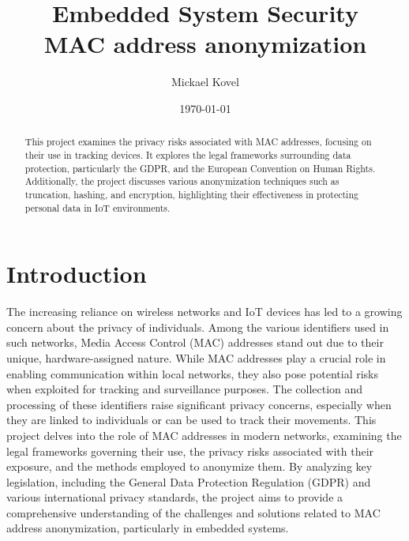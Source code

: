 \documentclass[aps,prb,twocolumn,superscriptaddress,floatfix,longbibliography,nofootinbib]{revtex4-2}
\newcommand{\mytitle}{Embedded System Security \\ MAC address anonymization}
\begin{document}

\title{\mytitle}

\author{Mickael Kovel}

\date{\today}

\begin{abstract}
This project examines the privacy risks associated with MAC addresses, focusing
on their use in tracking devices. It explores the legal frameworks surrounding 
data protection, particularly the GDPR, and the European Convention on Human Rights. 
Additionally, the project discusses various anonymization techniques such as truncation,
hashing, and encryption, highlighting their effectiveness in protecting personal data in
IoT environments.

\end{abstract}

\maketitle
\tableofcontents
\section{\label{sec:Intro}Introduction}
The increasing reliance on wireless networks and IoT devices has led to a 
growing concern about the privacy of individuals. Among the various identifiers 
used in such networks, Media Access Control (MAC) addresses stand out due to their 
unique, hardware-assigned nature. While MAC addresses play a crucial role in enabling 
communication within local networks, they also pose potential risks when exploited for 
tracking and surveillance purposes. The collection and processing of these identifiers 
raise significant privacy concerns, especially when they are linked to individuals or 
can be used to track their movements. This project delves into the role of MAC addresses 
in modern networks, examining the legal frameworks governing their use, the privacy risks
associated with their exposure, and the methods employed to anonymize them. By analyzing 
key legislation, including the General Data Protection Regulation (GDPR) and various 
international privacy standards, the project aims to provide a comprehensive understanding 
of the challenges and solutions related to MAC address anonymization, particularly in 
embedded systems.
\end{document}
